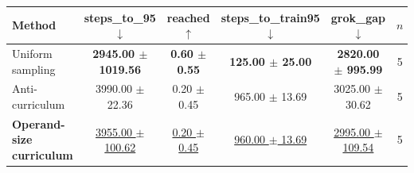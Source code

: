 \begin{tabular}{lccccc}
\toprule
Method & steps\_to\_95 $\downarrow$ & reached $\uparrow$ & steps\_to\_train95 $\downarrow$ & grok\_gap $\downarrow$ & $n$ \\
\midrule
Uniform sampling & \textbf{2945.00 $\pm$ 1019.56} & \textbf{0.60 $\pm$ 0.55} & \textbf{125.00 $\pm$ 25.00} & \textbf{2820.00 $\pm$ 995.99} & 5 \\
Anti-curriculum & 3990.00 $\pm$ 22.36 & 0.20 $\pm$ 0.45 & 965.00 $\pm$ 13.69 & 3025.00 $\pm$ 30.62 & 5 \\
\textbf{Operand-size curriculum} & \underline{3955.00 $\pm$ 100.62} & \underline{0.20 $\pm$ 0.45} & \underline{960.00 $\pm$ 13.69} & \underline{2995.00 $\pm$ 109.54} & 5 \\
\bottomrule
\end{tabular}
